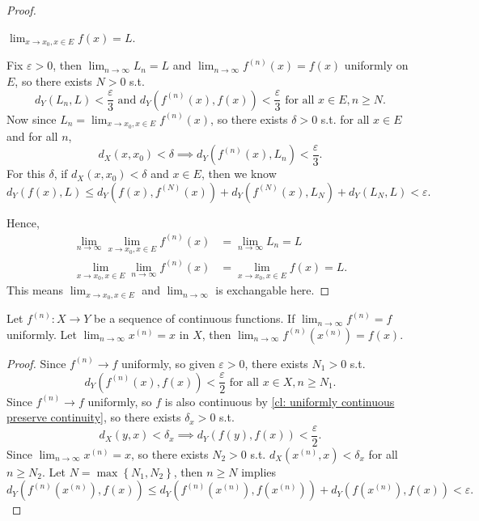 \begin{proof}
    \begin{claim}
        \(\lim_{x \to x_0, x \in E} f(x) = L\). 
    \end{claim}    
    \begin{explanation}
        Fix \(\varepsilon > 0\), then \(\lim_{n \to \infty} L_n = L \) and \(\lim_{n \to \infty} f^{(n)}(x) = f(x) \) uniformly on \(E\), so there exists \(N > 0\) s.t. 
        \[
            d_Y \left( L_n, L \right) < \frac{\varepsilon}{3} \text{ and } d_Y \left( f^{(n)}(x), f(x) \right) < \frac{\varepsilon}{3} \text{ for all } x \in E, n \ge N.  
        \] 
        Now since \(L_n = \lim_{x \to x_0, x \in E} f^{(n)}(x)\), so there exists \(\delta > 0\) s.t. for all \(x \in E\) and for all \(n\),  
        \[
            d_X(x, x_0) < \delta \implies d_Y \left( f^{(n)}(x), L_n \right) < \frac{\varepsilon}{3}.
        \]  
        For this \(\delta \), if \(d_X(x, x_0) < \delta \) and \(x \in E\), then we know 
        \[
            d_Y (f(x), L) \le d_Y \left( f(x), f^{(N)}(x) \right) + d_Y \left( f^{(N)}(x), L_N \right) + d_Y \left( L_N, L \right) < \varepsilon.  
        \]     
    \end{explanation} 
    Hence, 
    \begin{align*}
        \lim_{n \to \infty} \lim_{x \to x_0, x \in E} f^{(n)}(x) &= \lim_{n \to \infty} L_n = L \\
        \lim_{x \to x_0, x \in E} \lim_{n \to \infty} f^{(n)}(x) &= \lim_{x \to x_0, x \in E} f(x) = L. 
    \end{align*}  
    This means \(\lim_{x \to x_0, x \in E}\) and \(\lim_{n \to \infty} \) is exchangable here.
\end{proof}

\begin{proposition}
    Let \(f^{(n)}:X \to Y\) be a sequence of continuous functions. If \(\lim_{n \to \infty} f^{(n)} = f \) uniformly. Let \(\lim_{n \to \infty} x^{(n)} = x \) in \(X\), then \(\lim_{n \to \infty} f^{(n)}\left( x^{(n)} \right) = f(x)  \).     
\end{proposition}
\begin{proof}
    Since \(f^{(n)} \to  f\) uniformly, so given \(\varepsilon > 0\), there exists \(N_1 > 0\) s.t. 
    \[
        d_Y \left( f^{(n)}(x), f(x) \right) < \frac{\varepsilon}{2} \text{ for all } x \in X, n \ge N_1.  
    \]  
    Since \(f^{(n)} \to f\) uniformly, so \(f\) is also continuous by \autoref{cl: uniformly continuous preserve continuity}, so there exists \(\delta _x > 0\) s.t. 
    \[
        d_X(y, x) < \delta _x \implies d_Y \left( f(y), f(x) \right) < \frac{\varepsilon}{2}. 
    \]     
    Since \(\lim_{n \to \infty} x^{(n)} = x \), so there exists \(N_2 > 0\) s.t. \(d_X \left( x^{(n)}, x \right) < \delta _x \) for all \(n \ge N_2\). Let \(N = \max \left\{ N_1, N_2 \right\} \), then \(n \ge N\) implies 
    \[
        d_Y \left( f^{(n)}\left( x^{(n)} \right), f(x)  \right) \le d_Y \left( f^{(n)} \left( x^{(n)} \right), f \left( x^{(n)} \right)   \right) + d_Y \left( f \left( x^{(n)} \right), f(x)  \right) < \varepsilon .  
    \]     
\end{proof}

